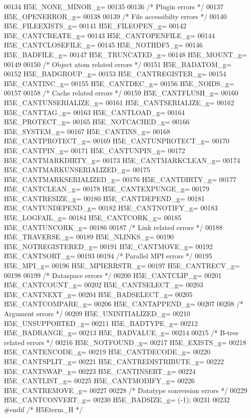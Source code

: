 \begin{DoxyCode}
00134 H5E\_NONE\_MINOR\_g=
00135 
00136 \textcolor{comment}{/* Plugin errors */}    
00137 H5E\_OPENERROR\_g=
00138 
00139 \textcolor{comment}{/* File accessibilty errors */}    
00140 H5E\_FILEEXISTS\_g=    
00141 H5E\_FILEOPEN\_g=    
00142 H5E\_CANTCREATE\_g=    
00143 H5E\_CANTOPENFILE\_g=    
00144 H5E\_CANTCLOSEFILE\_g=    
00145 H5E\_NOTHDF5\_g=    
00146 H5E\_BADFILE\_g=    
00147 H5E\_TRUNCATED\_g=    
00148 H5E\_MOUNT\_g=
00149 
00150 \textcolor{comment}{/* Object atom related errors */}    
00151 H5E\_BADATOM\_g=    
00152 H5E\_BADGROUP\_g=    
00153 H5E\_CANTREGISTER\_g=    
00154 H5E\_CANTINC\_g=    
00155 H5E\_CANTDEC\_g=    
00156 H5E\_NOIDS\_g=
00157 
00158 \textcolor{comment}{/* Cache related errors */}    
00159 H5E\_CANTFLUSH\_g=    
00160 H5E\_CANTUNSERIALIZE\_g=    
00161 H5E\_CANTSERIALIZE\_g=    
00162 H5E\_CANTTAG\_g=    
00163 H5E\_CANTLOAD\_g=    
00164 H5E\_PROTECT\_g=    
00165 H5E\_NOTCACHED\_g=    
00166 H5E\_SYSTEM\_g=    
00167 H5E\_CANTINS\_g=    
00168 H5E\_CANTPROTECT\_g=    
00169 H5E\_CANTUNPROTECT\_g=    
00170 H5E\_CANTPIN\_g=    
00171 H5E\_CANTUNPIN\_g=    
00172 H5E\_CANTMARKDIRTY\_g=    
00173 H5E\_CANTMARKCLEAN\_g=    
00174 H5E\_CANTMARKUNSERIALIZED\_g=    
00175 H5E\_CANTMARKSERIALIZED\_g=    
00176 H5E\_CANTDIRTY\_g=    
00177 H5E\_CANTCLEAN\_g=    
00178 H5E\_CANTEXPUNGE\_g=    
00179 H5E\_CANTRESIZE\_g=    
00180 H5E\_CANTDEPEND\_g=    
00181 H5E\_CANTUNDEPEND\_g=    
00182 H5E\_CANTNOTIFY\_g=    
00183 H5E\_LOGFAIL\_g=    
00184 H5E\_CANTCORK\_g=    
00185 H5E\_CANTUNCORK\_g=
00186 
00187 \textcolor{comment}{/* Link related errors */}    
00188 H5E\_TRAVERSE\_g=    
00189 H5E\_NLINKS\_g=    
00190 H5E\_NOTREGISTERED\_g=    
00191 H5E\_CANTMOVE\_g=    
00192 H5E\_CANTSORT\_g=
00193 
00194 \textcolor{comment}{/* Parallel MPI errors */}    
00195 H5E\_MPI\_g=    
00196 H5E\_MPIERRSTR\_g=    
00197 H5E\_CANTRECV\_g=
00198 
00199 \textcolor{comment}{/* Dataspace errors */}    
00200 H5E\_CANTCLIP\_g=    
00201 H5E\_CANTCOUNT\_g=    
00202 H5E\_CANTSELECT\_g=    
00203 H5E\_CANTNEXT\_g=    
00204 H5E\_BADSELECT\_g=    
00205 H5E\_CANTCOMPARE\_g=    
00206 H5E\_CANTAPPEND\_g=
00207 
00208 \textcolor{comment}{/* Argument errors */}    
00209 H5E\_UNINITIALIZED\_g=    
00210 H5E\_UNSUPPORTED\_g=    
00211 H5E\_BADTYPE\_g=    
00212 H5E\_BADRANGE\_g=    
00213 H5E\_BADVALUE\_g=
00214 
00215 \textcolor{comment}{/* B-tree related errors */}    
00216 H5E\_NOTFOUND\_g=    
00217 H5E\_EXISTS\_g=    
00218 H5E\_CANTENCODE\_g=    
00219 H5E\_CANTDECODE\_g=    
00220 H5E\_CANTSPLIT\_g=    
00221 H5E\_CANTREDISTRIBUTE\_g=    
00222 H5E\_CANTSWAP\_g=    
00223 H5E\_CANTINSERT\_g=    
00224 H5E\_CANTLIST\_g=    
00225 H5E\_CANTMODIFY\_g=    
00226 H5E\_CANTREMOVE\_g=
00227 
00228 \textcolor{comment}{/* Datatype conversion errors */}    
00229 H5E\_CANTCONVERT\_g=    
00230 H5E\_BADSIZE\_g= (-1);
00231 
00232 \textcolor{preprocessor}{#endif }\textcolor{comment}{/* H5Eterm\_H */}\textcolor{preprocessor}{}
\end{DoxyCode}
